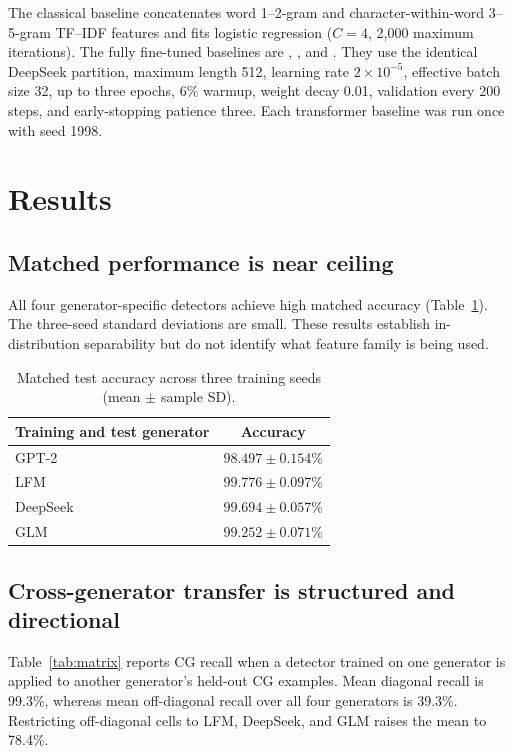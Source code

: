 \documentclass[utf8]{FrontiersinHarvard}
\begin{document}
The classical baseline concatenates word 1--2-gram and character-within-word 3--5-gram TF--IDF features and fits logistic regression ($C=4$, 2,000 maximum iterations). The fully fine-tuned baselines are  \citep{Liu2019},  \citep{He2021}, and  \citep{Warner2024}. They use the identical DeepSeek partition, maximum length 512, learning rate $2\times10^{-5}$, effective batch size 32, up to three epochs, 6\% warmup, weight decay 0.01, validation every 200 steps, and early-stopping patience three. Each transformer baseline was run once with seed 1998.

\section{Results}

\subsection{Matched performance is near ceiling}

All four generator-specific detectors achieve high matched accuracy (Table~\ref{tab:matched}). The three-seed standard deviations are small. These results establish in-distribution separability but do not identify what feature family is being used.

\begin{table}[h!]
\centering
\caption{Matched test accuracy across three training seeds (mean $\pm$ sample SD).}
\label{tab:matched}
\begin{tabular}{lc}
\toprule
Training and test generator & Accuracy \\
\midrule
GPT-2 & $98.497 \pm 0.154$\% \\
LFM & $99.776 \pm 0.097$\% \\
DeepSeek & $99.694 \pm 0.057$\% \\
GLM & $99.252 \pm 0.071$\% \\
\bottomrule
\end{tabular}
\end{table}

\subsection{Cross-generator transfer is structured and directional}

Table~\ref{tab:matrix} reports CG recall when a detector trained on one generator is applied to another generator's held-out CG examples. Mean diagonal recall is 99.3\%, whereas mean off-diagonal recall over all four generators is 39.3\%. Restricting off-diagonal cells to LFM, DeepSeek, and GLM raises the mean to 78.4\%.
\end{document}
